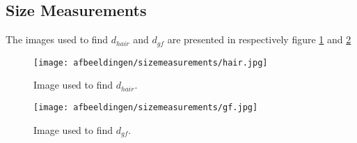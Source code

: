 \subsection{Size Measurements}
\label{appendix_sizemeasurements}

The images used to find $d_{hair}$ and $d_{gf}$ are presented in respectively figure \ref{fig_hair} and \ref{fig_gf}

\begin{figure}[h!]
    \centering
    \texttt{[image: afbeeldingen/sizemeasurements/hair.jpg]}
    \captionsetup{font=small, justification = centering}
    \caption{Image used to find $d_{hair}$.}
    \label{fig_hair}
\end{figure}

\begin{figure}[h!]
    \centering
    \texttt{[image: afbeeldingen/sizemeasurements/gf.jpg]}
    \captionsetup{font=small, justification = centering}
    \caption{Image used to find $d_{gf}$.}
    \label{fig_gf}
\end{figure}